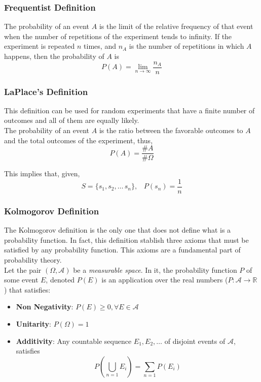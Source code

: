 \subsubsection{Frequentist Definition}
The probability of an event $A$ is the limit of the relative frequency of that event when the number of repetitions of the experiment tends to infinity.
If the experiment is repeated $n$ times, and $n_A$ is the number of repetitions in which $A$ happens, then the probability of $A$ is
\[ P(A) = \lim_{n \rightarrow \infty} \frac{n_A}{n} \] 

\subsubsection{LaPlace's Definition}
This definition can be used for random experiments that have a finite number of outcomes and all of them are equally likely.\\
The probability of an event $A$ is the ratio between the favorable outcomes to $A$ and the total outcomes of the experiment, thus,
\[  P(A) = \frac{\#A}{\#\Omega}  \]

This implies that, given,
\[ S = \{s_1,s_2,\dots\, s_n\},\;\;\; P(s_n)=\frac{1}{n} \]

\subsubsection{Kolmogorov Definition}
The Kolmogorov definition is the only one that does not define what is a probability function. In fact, this definition stablish three axioms that must be
satisfied by any probability function. This axioms are a fundamental part of probability theory.\\
Let the pair $(\Omega, \mathcal{A})$ be a \textit{measurable space}. In it, the probability function $P$ of some event $E$, denoted $P(E)$ is an application
over the real numbers ($P: \mathcal{A} \rightarrow \mathbb{R}$) that satisfies:

\begin{itemize}
    \item \textbf{Non Negativity}: $P(E) \geq 0, \forall E \in \mathcal{A}$
    \item \textbf{Unitarity}: $P(\Omega) = 1$
    \item \textbf{Additivity}: Any countable sequence $E_1, E_2, \dots$ of disjoint events of $\mathcal{A}$, satisfies
            \[ P(\bigcup_{n=1} E_i) = \sum_{n=1} P(E_i) \]
\end{itemize}


